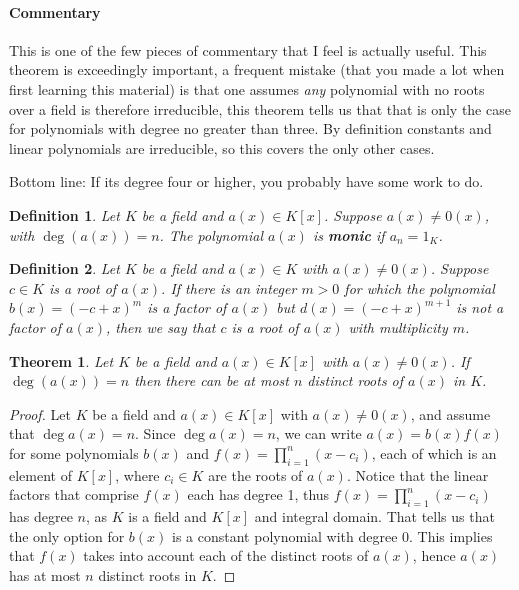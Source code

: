 \documentclass[letterpaper, 12pt]{article}
\newtheorem{defn}{Definition}
\newtheorem{thm}{Theorem}
\begin{document}
			\paragraph{\color{blue}Commentary}
			\color{blue}
			This is one of the few pieces of commentary that I feel is actually useful.
			This theorem is exceedingly important, a frequent mistake (that you made a lot when first learning this material) is that one assumes \textit{any} polynomial with no roots over a field is therefore irreducible, this theorem tells us that that is only the case for polynomials with degree no greater than three.
			By definition constants and linear polynomials are irreducible, so this covers the only other cases.

			Bottom line: If its degree four or higher, you probably have some work to do.
			\color{black}

			\setcounter{defn}{23}
			\begin{defn}
			Let $K$ be a field and $a(x) \in K[x]$. 
			Suppose $a(x) \neq 0(x)$, with $\deg(a(x)) = n$. 
			The polynomial $a(x)$ is \textbf{\textit{monic}} if $a_{n} = 1_{K}$.
			\end{defn}

			\setcounter{defn}{25}
			\begin{defn}
			Let $K$ be a field and $a(x) \in K$ with $a(x) \neq 0(x)$. 
			Suppose $c \in K$ is a root of $a(x)$. 
			If there is an integer $m > 0$ for which the polynomial $b(x) = (-c +x)^{m}$ is a factor of $a(x)$ but $d(x) = (-c + x)^{m+1}$ is not a factor of $a(x)$, then we say that $c$ is a root of $a(x)$ with multiplicity $m$.
			\end{defn}

			\setcounter{thm}{26}
			\begin{thm}
			Let $K$ be a field and $a(x) \in K[x]$ with $a(x) \neq 0(x)$. 
			If $\deg(a(x)) = n$ then there can be at most $n$ distinct roots of $a(x)$ in $K$.
			\end{thm}
			\color{blue}
			\begin{proof}
			Let $K$ be a field and $a(x) \in K[x]$ with $a(x) \neq 0(x)$, and assume that $\deg{a(x)} = n$.
			Since $\deg{a(x)} = n$, we can write $a(x) = b(x)f(x)$ for some polynomials $b(x)$ and $f(x) = \prod_{i=1}^{n} (x-c_{i})$, each of which is an element of $K[x]$, where $c_{i} \in K$ are the roots of $a(x)$.
			Notice that the linear factors that comprise $f(x)$ each has degree 1, thus $f(x) = \prod_{i=1}^{n} (x-c_{i})$ has degree $n$, as $K$ is a field and $K[x]$ and integral domain.
			That tells us that the only option for $b(x)$ is a constant polynomial with degree 0.
			This implies that $f(x)$ takes into account each of the distinct roots of $a(x)$, hence $a(x)$ has at most $n$ distinct roots in $K$.
			\end{proof}
			\color{black}
\end{document}
